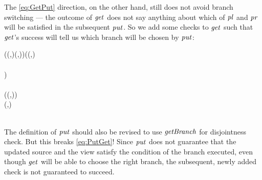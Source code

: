 The \ref{eq:GetPut} direction, on the other hand, still does not avoid branch switching --- the outcome of \ensuremath{\Varid{get}} does not say anything about which of \ensuremath{\Varid{pl}} and \ensuremath{\Varid{pr}} will be satisfied in the subsequent \ensuremath{\Varid{put}}.
So we add some checks to \ensuremath{\Varid{get}} such that \ensuremath{\Varid{get}}'s success will tell us which branch will be chosen by \ensuremath{\Varid{put}}:
\begin{hscode}\SaveRestoreHook
{}%
%
%
%
%
%
%
%
\>[B]{}\;(\;(,)\;(,))\;\mathrel{=}\;{}\<[39]%
\>[39]{}(\;{}\<[44]%
\>[44]{}\leftarrow {}\;(,)\;\<[E]%
\\
\>[44]{}\;\;\;\;{}\<[55]%
\>[55]{}\;{}\<[61]%
\>[61]{}\<[E]%
\\
\>[55]{}\;{}\<[61]%
\>[61]{}\;)\;{}\<[E]%
\\
\>[39]{}\;{}\<[E]%
\\
\>[39]{}(\;(,)\;){}\<[E]%
\\[\blanklineskip]%
\>[B]{}\;(,)\;\mathrel{=}\;{}\<[27]%
\>[27]{}\leftarrow {}\;\;\<[E]%
\\
\>[27]{}\;\;\;\;{}\<[38]%
\>[38]{}\;{}\<[44]%
\>[44]{}\;\<[E]%
\\
\>[38]{}\;{}\<[44]%
\>[44]{}\<[E]%
\ColumnHook
\end{hscode}\resethooks
The definition of \ensuremath{\Varid{put}} should also be revised to use \ensuremath{\Varid{getBranch}} for disjointness check.
But this breaks \ref{eq:PutGet}! Since \ensuremath{\Varid{put}} does not guarantee that the updated source and the view satisfy the condition of the branch executed, even though \ensuremath{\Varid{get}} will be able to choose the right branch, the subsequent, newly added check is not guaranteed to succeed.
